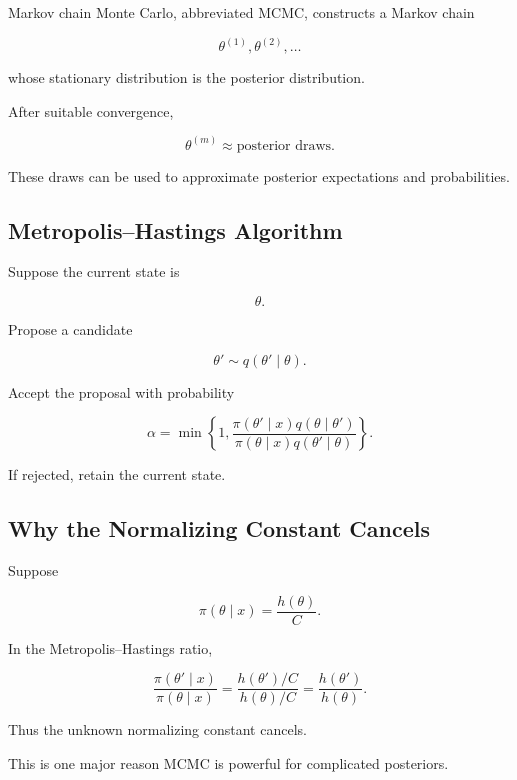 Markov chain Monte Carlo, abbreviated MCMC, constructs a Markov chain

\[
\theta^{(1)},
\theta^{(2)},
\ldots
\]

whose stationary distribution is the posterior distribution.

After suitable convergence,

\[
\boxed{
\theta^{(m)}
\approx
\text{posterior draws}.
}
\]

These draws can be used to approximate posterior expectations and
probabilities.

\subsection{Metropolis--Hastings Algorithm}
\label{subsec:metropolis-hastings}

Suppose the current state is

\[
\theta.
\]

Propose a candidate

\[
\theta'
\sim
q(\theta'\mid\theta).
\]

Accept the proposal with probability

\[
\boxed{
\alpha
=
\min
\left\{
1,
\frac{
\pi(\theta'\mid x)
q(\theta\mid\theta')
}{
\pi(\theta\mid x)
q(\theta'\mid\theta)
}
\right\}.
}
\]

If rejected, retain the current state.

\subsection{Why the Normalizing Constant Cancels}
\label{subsec:mcmc-normalizing-constant}

Suppose

\[
\pi(\theta\mid x)
=
\frac{
h(\theta)
}{
C
}.
\]

In the Metropolis--Hastings ratio,

\[
\frac{
\pi(\theta'\mid x)
}{
\pi(\theta\mid x)
}
=
\frac{
h(\theta')/C
}{
h(\theta)/C
}
=
\frac{
h(\theta')
}{
h(\theta)
}.
\]

Thus the unknown normalizing constant cancels.

This is one major reason MCMC is powerful for complicated posteriors.

